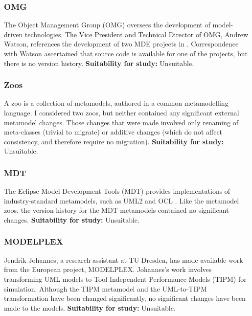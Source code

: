 \subsubsection{OMG}
\label{par:omg}
The Object Management Group (OMG) \cite{omg} oversees the development of model-driven technologies. The Vice President and Technical Director of OMG, Andrew Watson, references the development of two MDE projects in \cite{watson08mdahistory}. Correspondence with Watson ascertained that source code is available for one of the projects, but there is no version history. \textbf{Suitability for study:} Unsuitable.

\subsubsection{Zoos}
\label{par:zoos}
A zoo is a collection of metamodels, authored in a common metamodelling language. I considered two zoos, but neither contained any significant external metamodel changes. Those changes that were made involved only renaming of meta-classes (trivial to migrate) or additive changes (which do not affect consistency, and therefore require no migration). \textbf{Suitability for study:} Unsuitable.

\subsubsection{MDT}
The Eclipse Model Development Tools (MDT) \cite{mdt} provides implementations of industry-standard metamodels, such as UML2 \cite{uml212} and OCL \cite{ocl2}. Like the metamodel zoos, the version history for the MDT metamodels contained no significant changes. \textbf{Suitability for study:} Unsuitable.

\subsubsection{MODELPLEX}
Jendrik Johannes, a research assistant at TU Dresden, has made available work from the European project, MODELPLEX. Johannes's work involves transforming UML models to Tool Independent Performance Models (TIPM) for simulation. Although the TIPM metamodel and the UML-to-TIPM transformation have been changed significantly, no significant changes have been made to the models. \textbf{Suitability for study:} Unsuitable.

